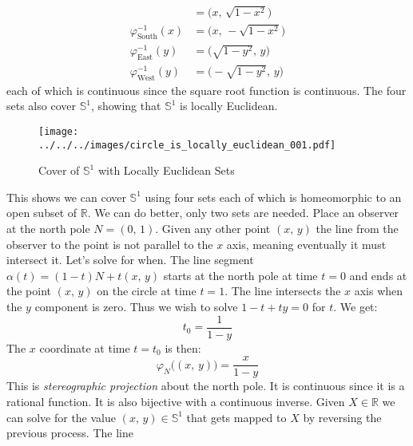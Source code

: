 \documentclass{article}
\theoremstyle{plain}
\theoremstyle{normal}
\newenvironment{example}{%
    \pushQED{\qed}\renewcommand{\qedsymbol}{$\blacksquare$}\examplex%
}{%
    \popQED\endexamplex%
}
\begin{document}
\begin{example}
\begin{align}
                &=\big(x,\,\sqrt{1-x^{2}}\big)\\
                \varphi_{\textrm{South}}^{-1}(x)
                &=\big(x,\,-\sqrt{1-x^{2}}\big)\\
                \varphi_{\textrm{East}}^{-1}(y)
                &=\big(\sqrt{1-y^{2}},\,y\big)\\
                \varphi_{\textrm{West}}^{-1}(y)
                &=\big(-\sqrt{1-y^{2}},\,y\big)
            \end{align}
            each of which is continuous since the square root function is
            continuous. The four sets also cover $\mathbb{S}^{1}$, showing that
            $\mathbb{S}^{1}$ is locally Euclidean.
        \end{example}
        \begin{figure}
            \centering
            \texttt{[image: ../../../images/circle\_is\_locally\_euclidean\_001.pdf]}
            \caption{Cover of $\mathbb{S}^{1}$ with Locally Euclidean Sets}
            \label{fig:circle_is_locally_euclidean_001}
        \end{figure}
        This shows we can cover $\mathbb{S}^{1}$ using four sets each of which
        is homeomorphic to an open subset of $\mathbb{R}$. We can do better,
        only two sets are needed. Place an observer at the north pole
        $N=(0,\,1)$. Given any other point $(x,\,y)$ the line from the
        observer to the point is not parallel to the $x$ axis, meaning
        eventually it must intersect it. Let's solve for when. The line segment
        $\alpha(t)=(1-t)N+t(x,\,y)$ starts at the north pole at time $t=0$ and
        ends at the point $(x,\,y)$ on the circle at time $t=1$. The line
        intersects the $x$ axis when the $y$ component is zero. Thus we wish
        to solve $1-t+ty=0$ for $t$. We get:
        \begin{equation}
            t_{0}=\frac{1}{1-y}
        \end{equation}
        The $x$ coordinate at time $t=t_{0}$ is then:
        \begin{equation}
            \varphi_{N}\big((x,\,y)\big)
            =\frac{x}{1-y}
        \end{equation}
        This is \textit{stereographic projection} about the north pole. It is
        continuous since it is a rational function. It is also bijective with a
        continuous inverse. Given $X\in\mathbb{R}$ we can solve for the value
        $(x,\,y)\in\mathbb{S}^{1}$ that gets mapped to $X$ by reversing the
        previous process. The line
\end{document}
